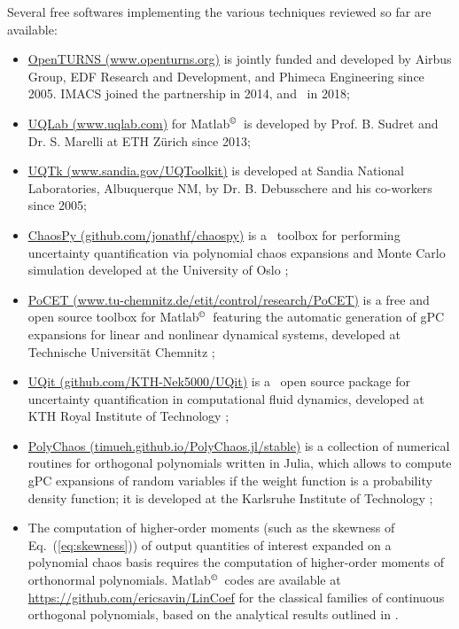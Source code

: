 \documentclass{eurosae}
\newcommand{\eref}[1]{Eq.~(\ref{#1})}
\newcommand{\Matlab}{Matlab$^\copyright$}
\begin{document}
Several free softwares implementing the various techniques reviewed so far are available:
\begin{itemize}
\item\href{http://www.openturns.org}{OpenTURNS (www.openturns.org)} is jointly funded and developed by Airbus Group, EDF Research and Development, and Phimeca Engineering since 2005. IMACS joined the partnership in 2014, and \Onera\ in 2018;
\item\href{https://www.uqlab.com}{UQLab (www.uqlab.com)} for \Matlab\ is developed by Prof. B. Sudret and Dr. S. Marelli at ETH Z\" urich since 2013;
\item\href{https://www.sandia.gov/UQToolkit}{UQTk (www.sandia.gov/UQToolkit)} is developed at Sandia National Laboratories, Albuquerque NM, by Dr. B. Debusschere and his co-workers since 2005;
\item\href{https://github.com/jonathf/chaospy}{ChaosPy (github.com/jonathf/chaospy)} is a \Python\ toolbox for performing uncertainty quantification via polynomial chaos expansions and Monte Carlo simulation developed at the University of Oslo \cite{FEI15};
\item\href{https://www.tu-chemnitz.de/etit/control/research/PoCET/}{PoCET (www.tu-chemnitz.de/etit/control/research/PoCET)} is a free and open source toolbox for \Matlab\, featuring the automatic generation of gPC expansions for linear and nonlinear dynamical systems, developed at Technische Universit\"at Chemnitz \cite{PET20};
\item\href{https://github.com/KTH-Nek5000/UQit}{UQit (github.com/KTH-Nek5000/UQit)} is a \Python\ open source package for uncertainty quantification in computational fluid dynamics, developed at KTH Royal Institute of Technology \cite{REZ21};
\item\href{https://timueh.github.io/PolyChaos.jl/stable}{PolyChaos (timueh.github.io/PolyChaos.jl/stable)} is a collection of numerical routines for orthogonal polynomials written in Julia, which allows to compute gPC expansions of random variables if the weight function is a probability density function; it is developed at the Karlsruhe Institute of Technology \cite{MUH20};
\item The computation of higher-order moments (such as the skewness of \eref{eq:skewness}) of output quantities of interest expanded on a polynomial chaos basis requires the computation of higher-order moments of orthonormal polynomials. \Matlab\ codes are available at \href{https://github.com/ericsavin/LinCoef}{https://github.com/ericsavin/LinCoef} for the classical families of continuous orthogonal polynomials, based on the analytical results outlined in \cite{SAV17}.
\end{itemize}
\end{document}
